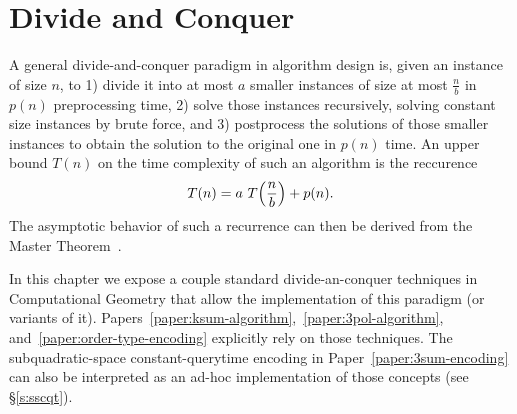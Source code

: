 \chapter{Divide and Conquer}%
\label{chapter:divide-and-conquer}

A general divide-and-conquer paradigm in algorithm design is,
given an instance of size \(n\), to 1) divide it into at most
\(a\) smaller instances of size at most \(\frac{n}{b}\) in \(p(n)\)
preprocessing time, 2) solve those instances recursively,
solving constant size instances by brute force, and 3) postprocess the
solutions of those smaller instances to obtain the solution to the original
one in \(p(n)\) time.
%
An upper bound \(T(n)\) on the time complexity of such an algorithm is the
reccurence
\begin{displaymath}
	T(n) = a \,\, T\mleft(\frac nb\mright) + p(n).
\end{displaymath}
%
The asymptotic behavior of such a recurrence can then be derived from the
Master Theorem~\cite{BHS80,CLRS09}.

In this chapter we expose a couple standard divide-an-conquer techniques in
Computational Geometry that allow the implementation of this paradigm (or
variants of it).
%
Papers~\ref{paper:ksum-algorithm},~\ref{paper:3pol-algorithm},
and~\ref{paper:order-type-encoding} explicitly rely on those techniques.
%
The subquadratic-space constant-querytime encoding in
Paper~\ref{paper:3sum-encoding} can also be interpreted as an ad-hoc
implementation of those concepts (see \S\ref{s:sscqt}).




